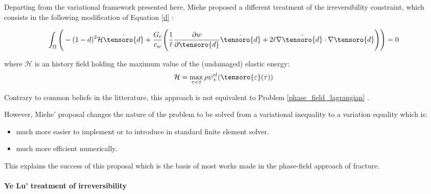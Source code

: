 Departing from the variational framework presented here, Miehe proposed a different treatment of the irreversibility constraint, which consists
in the following modification of Equation \eqref{d}
\cite{miehe_phase_2010}:

\begin{equation}
    \int_{\Omega}
    \Bigg(
        -(1-d)^2 \mathcal{H} \hat{\tensoro{d}}
        +
        \frac{G_c}{c_w}
        \Bigg(
            \frac{1}{\ell}
            \frac{\partial w}{\partial \tensoro{d}} \hat{\tensoro{d}}
            +
            2 \ell \nabla \hat{\tensoro{d}} \cdot \nabla \tensoro{d}
        \Bigg)
    \Bigg)
    = 0
\end{equation}


where $\mathcal{H}$ is an history field holding the maximum value of
the (undamaged) elastic energy:
\begin{equation}
    \mathcal{H}
    =
    \max_{\tau < t} \rho \psi^{el}_{+}(\tensoro{\varepsilon}(\tau))
\end{equation}

Contrary to common beliefs in the litterature, this approach is not
equivalent to Problem \eqref{phase_field_lagrangian}
\cite{gerasimov_numerical_2020}.

However, Miehe' proposal changes the nature of the problem to be solved
from a variational inequality to a variation equality which is:
\begin{itemize}
    \item much more easier to implement or to introduce in standard finite
    element solver.
    \item much more efficient numerically.
\end{itemize}

This explains the success of this proposal which is the basis of most
works made in the phase-field approach of fracture.

\paragraph{Ye Lu' treatment of irreversibility \cite{lu_schema_2019}}
\label{ye_lu_irreversibility}

